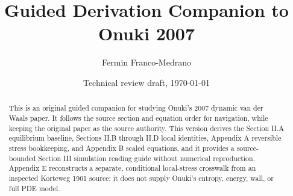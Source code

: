 \documentclass[11pt]{article}
\title{Guided Derivation Companion to Onuki 2007}
\author{Fermin Franco-Medrano}
\date{Technical review draft, \today}
\begin{document}
\maketitle

\begin{abstract}
This is an original guided companion for studying Onuki's 2007 dynamic van der
Waals paper. It follows the source section and equation order for navigation,
while keeping the original paper as the source authority. This version derives
the Section II.A equilibrium baseline, Sections II.B through II.D local
identities, Appendix A reversible stress bookkeeping, and Appendix B scaled
equations, and it provides a source-bounded Section III simulation reading guide
without numerical reproduction. Appendix E reconstructs a separate,
conditional local-stress crosswalk from an inspected Korteweg 1901 source; it
does not supply Onuki's entropy, energy, wall, or full PDE model.
\end{abstract}

\tableofcontents


















\appendix








\end{document}
